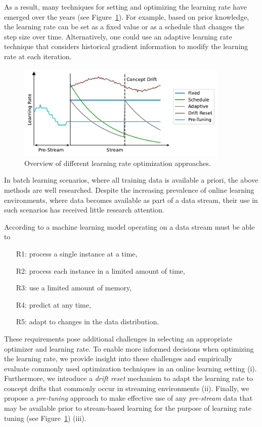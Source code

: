 \documentclass{article} %
\begin{document}
As a result, many techniques for setting and optimizing the learning rate have emerged over the years (see Figure~\ref{fig:lr_overview}).
For example, based on prior knowledge, the learning rate can be set as a fixed value or as a schedule that changes the step size over time.
Alternatively, one could use an adaptive learning rate technique that considers historical gradient information to modify the learning rate at each iteration.
\begin{figure}[ht]
   \centering
   \includegraphics[width=0.9\textwidth]{figures/lr_overview.pdf}
   \caption{Overview of different learning rate optimization approaches.}
   \label{fig:lr_overview}
\end{figure}
In batch learning scenarios, where all training data is available a priori, the above methods are well researched.
Despite the increasing prevalence of online learning environments, where data becomes available as part of a data stream, their use in such scenarios has received little research attention.

According to \citet{bifetMOAMassiveOnline2010} a machine learning model operating on a data stream must be able to
\begin{enumerate}
   \item[R1:] process a single instance at a time,\label{rq:single_instance}
   \item[R2:] process each instance in a limited amount of time,\label{rq:limited_time}
   \item[R3:] use a limited amount of memory,\label{rq:limited_memory}
   \item[R4:] predict at any time,\label{rq:predict_any_time}
   \item[R5:] adapt to changes in the data distribution.\label{rq:adapt_to_drift}
\end{enumerate}


These requirements pose additional challenges in selecting an appropriate optimizer and learning rate.
To enable more informed decisions when optimizing the learning rate, we provide insight into these challenges and empirically evaluate commonly used optimization techniques in an online learning setting (i).
Furthermore, we introduce a \textit{drift reset} mechanism to adapt the learning rate to concept drifts that commonly occur in streaming environments (ii).
Finally, we propose a \textit{pre-tuning} approach to make effective use of any \textit{pre-stream} data that may be available prior to stream-based learning for the purpose of learning rate tuning (see Figure~\ref{fig:lr_overview}) (iii).
\end{document}
